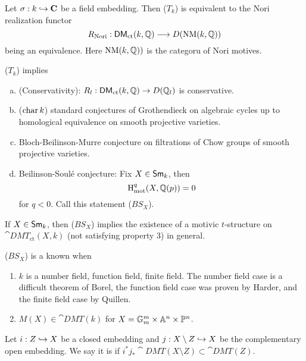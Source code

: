 \begin{proposition}
Let $\sigma:k\hookrightarrow \mathbf{C}$ be a field embedding. Then ($T_k$) is equivalent to the Nori
realization functor
\[
R_{\text{Nori}} : \cat{DM}_{\text{ct}}(k,\Q)\to D(\NM(k,\Q))
\]
being an equivalence. Here $\operatorname{NM}(k,\mathbb Q))$ is the categoru of Nori motives.
\end{proposition}
\begin{theorem}
($T_k$) implies
\begin{enumerate}[a)]
\item (Conservativity): $R_l:\cat{DM}_{\text{ct}}(k,\Q)\to D(\Q_l)$ is conservative.
\item ($\operatorname{char} k$) standard conjectures of Grothendieck on algebraic cycles up to
homological equivalence on smooth projective varieties.
\item Bloch-Beilinson-Murre conjecture on filtrations of Chow groups of smooth projective varieties.
\item Beilinson-Soul\'e conjecture: Fix $X\in \mathsf{Sm}_k$, then
\[
\mathrm{H}_{\text{mot}}^{q}(X,\mathbb Q(p)) = 0
\]
for $q<0$. Call this statement ($BS_X$).
\end{enumerate}
\end{theorem}
\begin{theorem}[Levine]
If $X\in \mathsf{Sm}_k$, then ($BS_X$) implies the existence of a motivic $t$-structure on
$\cat{DMT}_{\text{ct}}(X,k)$ (not satisfying property 3) in general.
\end{theorem}
\begin{theorem}
($BS_X$) is a known when
\begin{enumerate}[1)]
\item $k$ is a number field, function field, finite field. The number field case is a
difficult theorem of Borel, the function field case was proven by Harder, and the finite field
case by Quillen.
\item $M(X)\in \cat{DMT}(k)$ for $X=\mathbb{G}_m^{m}\times \mathbb A^{n}\times \mathbb{P}^{n}$.
\end{enumerate}
\end{theorem}
\begin{definition}
Let $i:Z\hookrightarrow X$ be a closed embedding and $j:X\setminus Z\hookrightarrow X$ be the complementary
open embedding. We say it is  if $i^{*}j_*\cat{DMT}(X\setminus
Z)\subset \cat{DMT}(Z)$.

\end{definition}

\printbibliography


